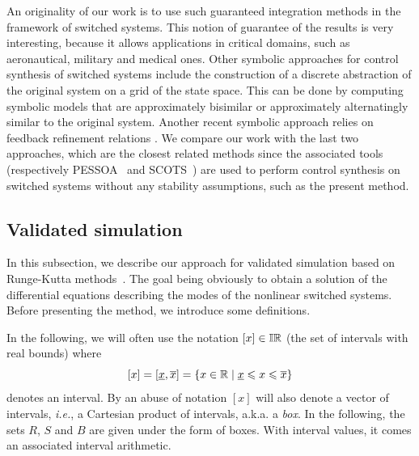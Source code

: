 An originality of our work is to use such guaranteed integration
methods in the framework of switched systems. This notion of guarantee
of the results is very interesting, because it allows applications in
critical domains, such as aeronautical, military and medical ones.
Other symbolic approaches for control synthesis of switched systems
include the construction of a discrete abstraction of the original
system on a grid of the state space. This can be done by computing
symbolic models that are approximately bisimilar
\cite{girard2010approximately} or approximately alternatingly similar
\cite{zamani2012symbolic} to the original system.  Another recent
symbolic approach relies on feedback refinement relations
\cite{reissig2015feedback}. We compare our work with the last two
approaches, which are the closest related methods since the associated
tools (respectively PESSOA~\cite{Mazo2010} and SCOTS~\cite{SCOTS}) are
used to perform control synthesis on switched systems without any
stability assumptions, such as the present method.





\subsection{Validated simulation}
\label{sec:simulation}

In this subsection, we describe our approach for validated simulation
based on Runge-Kutta methods~\cite{BCD13,report}. The goal being
obviously to obtain a solution of the differential equations
describing the modes of the nonlinear switched systems. Before
presenting the method, we introduce some definitions.


In the following, we will often use the notation $\lbrack x \rbrack
\in \mathbb{IR}$ (the set of intervals with real bounds) where
\begin{displaymath}
  \lbrack x \rbrack =
  \lbrack\underline{x}, \overline{x}\rbrack=
  \{ x \in \mathbb{R} \mid \underline{x} \leqslant x \leqslant \overline{x} \}
\end{displaymath}
denotes an interval.  By an abuse of notation $[x]$ will also denote a
vector of intervals, \emph{i.e.}, a Cartesian product of intervals,
a.k.a. a \emph{box}. In the following, the sets $R$, $S$ and $B$ are
given under the form of boxes. With interval values, it comes an
associated interval arithmetic.

